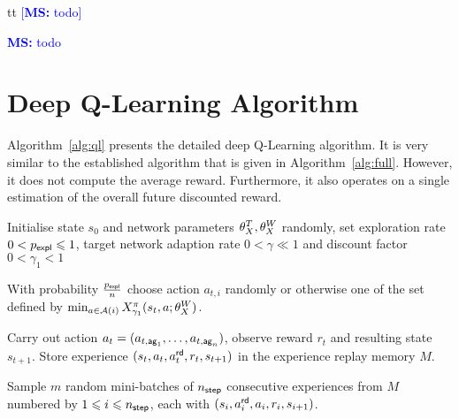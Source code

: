 \documentclass[envcountsame]{llncs}
\newcommand\MS[2][r]{\ifx t#1 \textcolor{blue}{[\textbf{MS:} #2]}
  \else \begin{center}\textcolor{blue}{\textbf{MS:} #2} \end{center} \fi}
\begin{document}
\MS[t]{todo}



\vfill
\pagebreak[4!]
\appendix

\section{Deep Q-Learning Algorithm}

Algorithm~\ref{alg:ql} presents the detailed deep Q-Learning algorithm. It is very similar to the
established \ARA{} algorithm that is given in Algorithm~\ref{alg:full}. However, it does not compute
the average reward. Furthermore, it also operates on a single estimation of the overall future
discounted reward.

\begin{algorithm}[h!]
  \begin{algorithmic}[1]
    \State{}Initialise state \(s_{0}\) and network parameters \(\theta_X^{T}, \theta_X^{W}\) randomly,
    set exploration rate \(0 < p_{\mathsf{expl}} \leqslant 1\), target network adaption rate
    \(0 < \gamma \ll 1\) and discount factor \(0 < \gamma_{1} < 1\)
      \State{}%
    \begin{minipage}[t]{\dimexpr\textwidth-\leftmargin-\labelsep-\labelwidth-\leftmargin+2pt}
      With probability \(\frac{p_{\mathsf{expl}}}{n}\) choose action \(a_{t,i}\) randomly or otherwise one of
      the set defined by
      \(\min_{a \in \mathcal{A}(i)}X^{\pi}_{\gamma_{1}}(s_{t},a; \theta_X^{W}{})\).
    \end{minipage}
    \EndFor{}
    \State{}%
    \begin{minipage}[t]{\dimexpr\textwidth-\leftmargin-\labelsep-\labelwidth}
      Carry out action \(a_{t}=(a_{t,\mathsf{ag}_{1}},\ldots,a_{t,\mathsf{ag}_{n}})\), observe reward
      \(r_{t}\) and resulting state \(s_{t+1}\). Store experience
      \((s_{t}, a_{t}, a_{t}^{\mathsf{rd}}, r_{t}, s_{t+1})\) in the experience replay memory \(M\).
    \end{minipage}
    \State{}%
    \begin{minipage}[t]{\dimexpr\textwidth-\leftmargin-\labelsep-\labelwidth-\leftmargin+2pt}
      Sample \(m\) random mini-batches of \(n_{\mathsf{step}}\) consecutive experiences from \(M\) numbered by
      \(1 \leqslant i \leqslant n_{\mathsf{step}}\), each with
      \((s_{i}, a_{i}^{\mathsf{rd}}, a_{i}, r_{i}, s_{i+1})\).

\end{minipage}
\end{algorithmic}
\end{algorithm}
\end{document}
